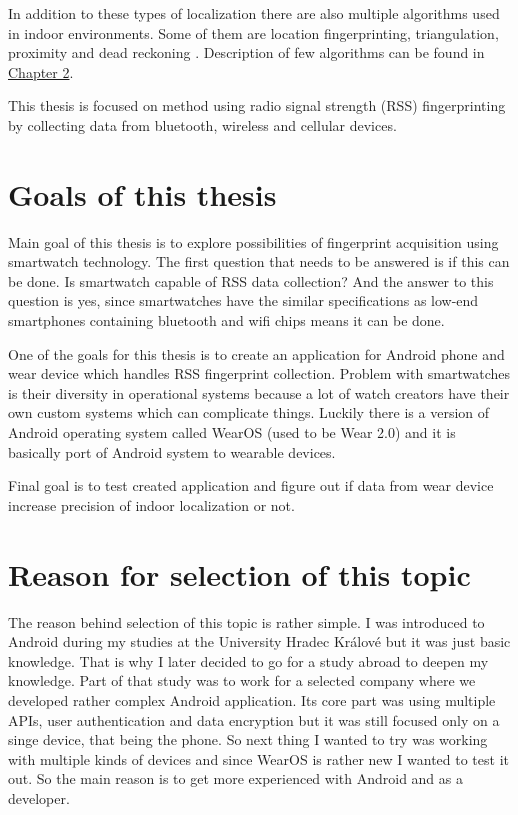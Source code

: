 In addition to these types of localization there are also multiple algorithms used in indoor environments. Some of them are location fingerprinting, triangulation, proximity and dead reckoning \cite{AaPLocalisation}. Description of few algorithms can be found in \hyperref[sec:LocalizationTechniques]{Chapter 2}.

This thesis is focused on method using radio signal strength (RSS) fingerprinting by collecting data from bluetooth, wireless and cellular devices.

\section{Goals of this thesis}\label{sec:GoalsOfThisThesis}
Main goal of this thesis is to explore possibilities of fingerprint acquisition using smartwatch technology. The first question that needs to be answered is if this can be done. Is smartwatch capable of RSS data collection? And the answer to this question is yes, since smartwatches have the similar specifications as low-end smartphones containing bluetooth and wifi chips means it can be done. 

One of the goals for this thesis is to create an application for Android phone and wear device which handles RSS fingerprint collection. Problem with smartwatches is their diversity in operational systems because a lot of watch creators have their own custom systems which can complicate things. Luckily there is a version of Android operating system called WearOS (used to be Wear 2.0) and it is basically port of Android system to wearable devices. 

Final goal is to test created application and figure out if data from wear device increase precision of indoor localization or not.

\section{Reason for selection of this topic}\label{sec:ReasonForSelectionOfThisTopic}
The reason behind selection of this topic is rather simple. I was introduced to Android during my studies at the University Hradec Králové but it was just basic knowledge. That is why I later decided to go for a study abroad to deepen my knowledge. Part of that study was to work for a selected company where we developed rather complex Android application. Its core part was using multiple APIs, user authentication and data encryption but it was still focused only on a singe device, that being the phone. So next thing I wanted to try was working with multiple kinds of devices and since WearOS is rather new I wanted to test it out. So the main reason is to get more experienced with Android and as a developer.